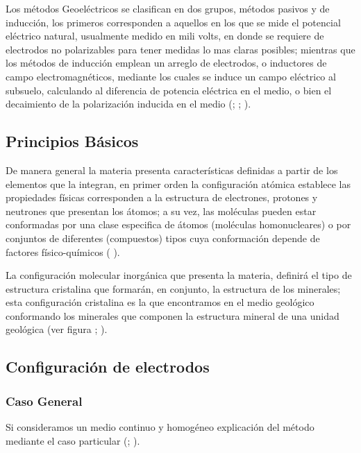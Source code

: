 		Los métodos Geoeléctricos se clasifican en dos grupos, métodos pasivos y de inducción, los primeros corresponden a aquellos en los que se mide el potencial eléctrico natural, usualmente medido en mili volts, en donde se requiere de electrodos no polarizables para tener medidas lo mas claras posibles; mientras que los métodos de inducción emplean un arreglo de electrodos, o inductores de campo electromagnéticos, mediante los cuales se induce un campo eléctrico al subsuelo, calculando al diferencia de potencia eléctrica en el medio, o bien el decaimiento de la polarización inducida en el medio (\cite{revil2013}; \cite{reynolds2011}; \cite{igboama2023}).\\
		
		
		\subsection{Principios Básicos}
		
			De manera general la materia presenta características definidas a partir de los elementos que la integran, en primer orden la configuración atómica establece las propiedades físicas corresponden a la estructura de electrones, protones y neutrones que presentan los átomos; a su vez, las moléculas pueden estar conformadas por una clase especifica de átomos (moléculas homonucleares) o por conjuntos de diferentes (compuestos) tipos cuya conformación depende de factores físico-químicos ( \cite{tiab2024}).%
			
			La configuración molecular inorgánica que presenta la materia, definirá el tipo de estructura cristalina que formarán, en conjunto, la estructura de los minerales; esta configuración cristalina es la que encontramos en el medio geológico conformando los minerales que componen la estructura mineral de una unidad geológica (ver figura \cite{tiab2024}; \cite{gandhi2016}).\\
		\subsection{Configuración de electrodos}
			\subsubsection{Caso General}
				Si consideramos un medio continuo y homogéneo explicación del método mediante el caso particular (\cite{reynolds2011}; \cite{igboama2023}).\\
				  
